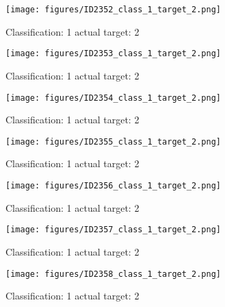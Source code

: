\begin{figure}[h!]
\begin{center}
\texttt{[image: figures/ID2352\_class\_1\_target\_2.png]}
\end{center}
\caption{ Classification: 1 actual target: 2}
\label{fig:ID2352_class_1_target_2}
\end{figure}
\begin{figure}[h!]
\begin{center}
\texttt{[image: figures/ID2353\_class\_1\_target\_2.png]}
\end{center}
\caption{ Classification: 1 actual target: 2}
\label{fig:ID2353_class_1_target_2}
\end{figure}
\begin{figure}[h!]
\begin{center}
\texttt{[image: figures/ID2354\_class\_1\_target\_2.png]}
\end{center}
\caption{ Classification: 1 actual target: 2}
\label{fig:ID2354_class_1_target_2}
\end{figure}
\begin{figure}[h!]
\begin{center}
\texttt{[image: figures/ID2355\_class\_1\_target\_2.png]}
\end{center}
\caption{ Classification: 1 actual target: 2}
\label{fig:ID2355_class_1_target_2}
\end{figure}
\begin{figure}[h!]
\begin{center}
\texttt{[image: figures/ID2356\_class\_1\_target\_2.png]}
\end{center}
\caption{ Classification: 1 actual target: 2}
\label{fig:ID2356_class_1_target_2}
\end{figure}
\begin{figure}[h!]
\begin{center}
\texttt{[image: figures/ID2357\_class\_1\_target\_2.png]}
\end{center}
\caption{ Classification: 1 actual target: 2}
\label{fig:ID2357_class_1_target_2}
\end{figure}
\begin{figure}[h!]
\begin{center}
\texttt{[image: figures/ID2358\_class\_1\_target\_2.png]}
\end{center}
\caption{ Classification: 1 actual target: 2}
\label{fig:ID2358_class_1_target_2}
\end{figure}
